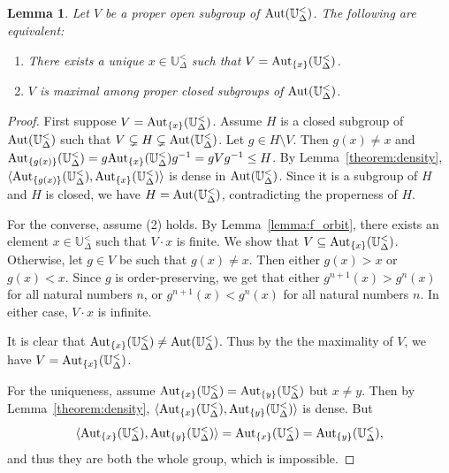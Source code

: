 \documentclass[10pt,a4paper]{amsart}
\newtheorem{lemma}[theorem]{Lemma}
\theoremstyle{definition}
\theoremstyle{remark}
\begin{document}
     \begin{lemma}\label{lem:maxopen}
        Let $V$ be a proper open subgroup of ${\rm Aut}(\mathbb{U}_{\Delta}^<)$. The following are equivalent:
        \begin{enumerate}
           \item[\rm (1)] There exists a unique $x \in \mathbb{U}_{\Delta}^<$ such that $V = {\rm Aut}_{\{x\}}(\mathbb{U}_{\Delta}^<)$. 
           \item[\rm (2)] $V$ is maximal among proper closed subgroups of ${\rm Aut}(\mathbb{U}_{\Delta}^<)$. 
        \end{enumerate}
        \end{lemma}
\begin{proof}
           First suppose $V = {\rm Aut}_{\{x\}}(\mathbb{U}_{\Delta}^<)$. Assume $H$ is a closed subgroup of $\mbox{\rm Aut}(\mathbb{U}^<_\Delta)$ such that $V\subsetneq H\subsetneq \mbox{\rm Aut}(\mathbb{U}^<_\Delta)$.  Let $g \in H \setminus V$. Then $g(x) \neq x$ and ${\rm Aut}_{\{g(x)\}}(\mathbb{U}_{\Delta}^<) = g{\rm Aut}_{\{x\}}(\mathbb{U}_{\Delta}^<)g^{-1}=gVg^{-1} \leq H$. By Lemma~\ref{theorem:density}, $\langle {\rm Aut}_{\{g(x)\}}(\mathbb{U}_{\Delta}^<), {\rm Aut}_{\{x\}}(\mathbb{U}_{\Delta}^<) \rangle$ is dense in ${\rm Aut}(\mathbb{U}_{\Delta}^<)$. Since it is a subgroup of $H$ and $H$ is closed, we have $H= {\rm Aut}(\mathbb{U}_{\Delta}^<)$, contradicting the properness of $H$. 
     
           For the converse, assume (2) holds. By Lemma~\ref{lemma:f_orbit}, there exists an element $x \in \mathbb{U}_{\Delta}^<$ such that $V\cdot x$ is finite. We show that $V\subseteq \mbox{\rm Aut}_{\{x\}}(\mathbb{U}^<_\Delta)$. Otherwise, let $g \in V$ be such that $g(x) \neq x$. Then either $g(x)>x$ or $g(x)<x$. Since $g$ is order-preserving, we get that either $g^{n+1}(x) > g^n(x)$ for all natural numbers $n$, or $g^{n+1}(x)<g^n(x)$ for all natural numbers $n$. In either case, $V\cdot x$ is infinite. 
           
It is clear that $\mbox{\rm Aut}_{\{x\}}(\mathbb{U}^<_\Delta)\neq \mbox{\rm Aut}(\mathbb{U}^<_\Delta)$. Thus by the the maximality of $V$, we have
$V=\mbox{\rm Aut}_{\{x\}}(\mathbb{U}^<_\Delta)$.
     
           For the uniqueness, assume ${\rm Aut}_{\{x\}}(\mathbb{U}_{\Delta}^<) = {\rm Aut}_{\{y\}}(\mathbb{U}_{\Delta}^<)$ but $x \neq y$. Then by Lemma~\ref{theorem:density}, $\langle {\rm Aut}_{\{x\}}(\mathbb{U}_{\Delta}^<), {\rm Aut}_{\{y\}}(\mathbb{U}_{\Delta}^<) \rangle$ is dense. But $$\langle {\rm Aut}_{\{x\}}(\mathbb{U}_{\Delta}^<), {\rm Aut}_{\{y\}}(\mathbb{U}_{\Delta}^<) \rangle={\rm Aut}_{\{x\}}(\mathbb{U}_{\Delta}^<) = {\rm Aut}_{\{y\}}(\mathbb{U}_{\Delta}^<),$$ and thus they are both the whole group, which is impossible. 
        \end{proof}
\end{document}
